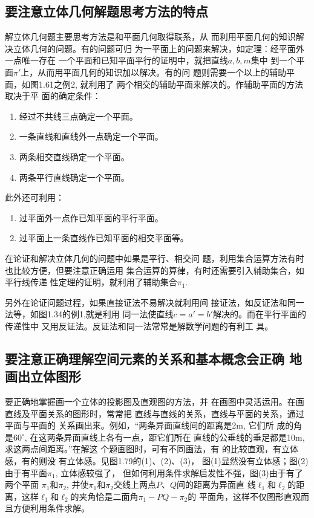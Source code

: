 \subsection{要注意立体几何解题思考方法的特点}
解立体几何题主要思考方法是和平面几何取得联系，从
而利用平面几何的知识解决立体几何的问题。有的问题可归
为一平面上的问题来解决，如定理：经平面外一点唯一存在
一个平面和已知平面平行的证明中，就把直线$a,b,m$集中
到一个平面$\pi'$上，从而用平面几何的知识加以解决。有的问
题则需要一个以上的辅助平面，如图1.61之例2, 就利用了
两个相交的辅助平面来解决的。作辅助平面的方法取决于平
面的确定条件：
\begin{enumerate}
\item 经过不共线三点确定一个平面。
\item 一条直线和直线外一点确定一个平面。
\item 两条相交直线确定一个平面。
\item 两条平行直线确定一个平面。
\end{enumerate}

此外还可利用：
\begin{enumerate}
\item 过平面外一点作已知平面的平行平面。
\item 过平面上一条直线作已知平面的相交平面等。
\end{enumerate}

在论证和解决立体几何的问题中如果是平行、相交问
题，利用集合运算方法有时也比较方便，但要注意正确运用
集合运算的算律，有时还需要引入辅助集合，如平行线传递
性定理的证明，就利用了辅助集合$\pi_1$. 

另外在论证问题过程，如果直接证法不易解决就利用间
接证法，如反证法和同一法等，如图1.34的例1,就是利用
同一法使直线$c=a'=b'$解决的。而在平行平面的传递性中
又用反证法。反证法和同一法常常是解数学问题的有利工
具。

\subsection{要注意正确理解空间元素的关系和基本概念会正确
地画出立体图形}
要正确地掌握画一个立体的投影图及直观图的方法，并
在画图中灵活运用。在画直线及平面关系的图形时，常常把
直线与直线的关系，直线与平面的关系，通过平面与平面的
关系画出来。例如，“两条异面直线间的距离是2m, 它们所
成的角是$60^{\circ}$, 在这两条异面直线上各有一点，距它们所在
直线的公垂线的垂足都是10m, 求这两点间距离。”在解这
个题画图时，可有不同画法，有
的比较直观，有立体感，有的则没
有立体感。见图1.79的(1)、(2)、(3)，
图(1)显然没有立体感；图(2)
由于有平面$\pi_1$, 立体感较强了，
但如何利用条件求解启发性不强，图(3)由于有了两个平面
$\pi_1$和$\pi_2$, 并使$\pi_1$和$\pi_2$交线上两点$P$、$Q$间的距离为异面直
线$\ell_1$和$\ell_2$的距离，这样$\ell_1$和$\ell_2$的夹角恰是二面角$\pi_1-PQ-\pi_2$的
平面角，这样不仅图形直观而且方便利用条件求解。

